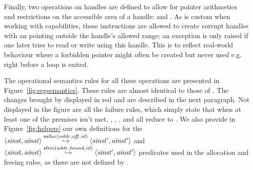 \documentclass[acmsmall,screen]{acmart}\settopmatter{}
\begin{document}
Finally, two operations on handles are defined to allow for pointer arithmetics and restrictions on the accessible area of a handle: \xxWhandleadd and \xxWslice. As is custom when working with capabilities, these instructions are allowed to create corrupt handles with an \xxWoffset pointing outside the handle's allowed range; an exception is only raised if one later tries to read or write using this handle. This is to reflect real-world behaviour where a forbidden pointer might often be created but never used e.g. right before a loop is exited.

The operational semantics rules for all these operations are presented in Figure~\ref{fig:segsemantics}. These rules are almost identical to those of \citet{mswasm}. The changes brought by \irismswasm displayed in red and are described in the next paragraph. Not displayed in the figure are all the failure rules, which simply state that when at least one of the premises isn't met, \xxWsegload, \xxWsegstore, \xxWsegfree, \xxWhandleadd and \xxWslice all reduce to \xxWtrap.
We also provide in Figure~\ref{fig:helpers} our own definitions for the \( \langle \mathit{sinst}, \mathit{ainst} \rangle\overset{\mathrm{salloc}(\mathit{addr}, \mathit{off}, \mathit{id})}{\hookrightarrow}\langle \mathit{sinst}', \mathit{ainst}' \rangle \) and \( \langle \mathit{sinst}, \mathit{ainst} \rangle\overset{\mathrm{sfree}(\mathit{addr}, \mathit{bound}, \mathit{id})}{\hookrightarrow}\langle \mathit{sinst}', \mathit{ainst}' \rangle \) predicates used in the allocation and freeing rules, as these are not defined by \citet{mswasm}.
\end{document}
